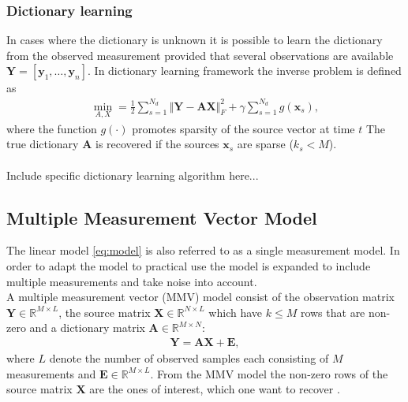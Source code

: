 \subsubsection{Dictionary learning}\label{sec:dictionarylearning}
In cases where the dictionary is unknown it is possible to learn the dictionary from the observed measurement provided that several observations are available $\textbf{Y}=\left[ \textbf{y}_1, \hdots ,\textbf{y}_n\right]$. 
In dictionary learning framework the inverse problem is defined as
\begin{align*}
\min_{A,X} = \frac{1}{2} \sum_{s=1}^{N_d} \Vert \mathbf{Y} - \mathbf{AX} \Vert_F^2 + \gamma \sum_{s=1}^{N_d} g(\mathbf{x}_s),
\end{align*}
where the function $g(\cdot)$ promotes sparsity of the source vector at time $t$ 
The true dictionary $\mathbf{A}$ is recovered if the sources $\mathbf{x}_s$ are sparse ($k_s < M$).
\\  \\
Include specific dictionary learning algorithm here...


\subsection{Multiple Measurement Vector Model}
The linear model \eqref{eq:model} is also referred to as a single measurement model. In order to adapt the model to practical use the model is expanded to include multiple measurements and take noise into account.\\ 
A multiple measurement vector (MMV) model consist of the observation matrix $\mathbf{Y} \in \mathbb{R}^{M \times L}$, the source matrix $\mathbf{X} \in \mathbb{R}^{N \times L}$ which have $k \leq M$ rows that are non-zero and a dictionary matrix $\mathbf{A} \in \mathbb{R}^{M \times N}$:
\begin{align*}
\mathbf{Y} = \mathbf{AX}+\textbf{E},
\end{align*}
where $L$ denote the number of observed samples each consisting of $M$ measurements and $\textbf{E} \in \mathbb{R}^{M \times L}$. From the MMV model the non-zero rows of the source matrix $\mathbf{X}$ are the ones of interest, which one want to recover \cite[p. 11]{phd2015}.
